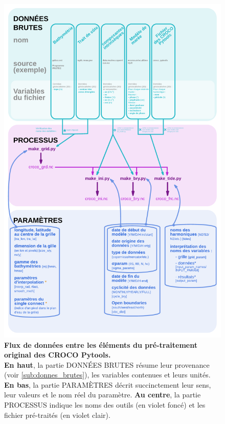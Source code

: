 \documentclass[10pt,a4paper,titlepage]{article}
\begin{document}
\begin{figure}[h!]
    \centering
    \includegraphics[scale=0.35]{../images/workflow/graphe_prepro_mere_original.pdf}
    \caption{
        \textbf{
        	Flux de données entre les éléments du pré-traitement original des CROCO Pytools.
        }
    \\
    \textbf{En haut}, la partie DONNÉES BRUTES résume leur provenance (voir \ref{sub:donnes_brutes}), les variables contenues et leurs unités.
    \textbf{En bas}, la partie PARAMÈTRES décrit succinctement leur sens, leur valeurs et le nom réel du paramètre.
    \textbf{Au centre}, la partie PROCESSUS indique les noms des outils (en violet foncé) et les fichier pré-traités (en violet clair).
    }
    \label{fig:workflow_prepro_original}
\end{figure}
\end{document}
